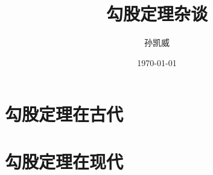 \documentclass[UTF8]{ctexart}
\title{勾股定理杂谈}
\author{孙凯威}
\date{\today}
\begin{document}
    \maketitle
    \tableofcontents
    \section{勾股定理在古代}
    \section{勾股定理在现代}
    
\end{document}
